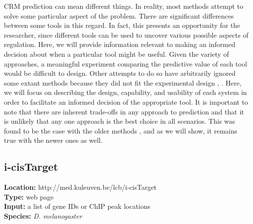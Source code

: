 \documentclass{frontiersENG} %
\begin{document}
CRM prediction can mean different things. In reality, most methods
attempt to solve some particular aspect of the problem. There are
significant differences between some tools in this regard. In fact,
this presents an opportunity for the researcher, since different tools
can be used to uncover various possible aspects of regulation. Here,
we will provide information relevant to making an informed decision
about when a particular tool might be useful. Given the variety of
approaches, a meaningful experiment comparing the predictive value of
each tool would be difficult to design. Other attempts to do so have
arbitrarily ignored some extant methods because they did not fit the
experimental design \cite{Su2010}, \cite{Klepper2008}. Here, we will
focus on describing the design, capability, and usability of each
system in order to facilitate an informed decision of the appropriate
tool. It is important to note that there are inherent trade-offs in
any approach to prediction and that it is unlikely that any one
approach is the best choice in all scenarios. This was found to be the
case with the older methods \cite{Su2010}, and as we will show, it
remains true with the newer ones as well.

\subsection{i-cisTarget}
\label{section:icistarget}
\noindent
\textbf{Location:} http://med.kuleuven.be/lcb/i-cisTarget \\
\textbf{Type:} web page \\
\textbf{Input:} a list of gene IDs or ChIP peak locations \\
\textbf{Species:} \textit{D. melanogaster} \\
\end{document}
